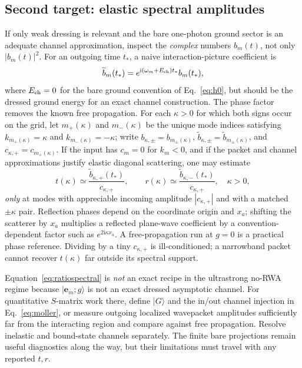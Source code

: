 \documentclass[11pt,a4paper]{article}
\newcommand{\ket}[1]{\lvert #1\rangle}
\newcommand{\ii}{\mathrm i}
\begin{document}
\subsection{Second target: elastic spectral amplitudes}
If only weak dressing is relevant and the bare one-photon ground sector is an adequate channel approximation, inspect the \emph{complex} numbers $b_m(t)$, not only $|b_m(t)|^2$. For an outgoing time $t_*$, a naive interaction-picture coefficient is
\begin{equation}
 \widetilde b_m(t_*)=e^{\ii(\omega_m+E_{\rm ch})t_*}b_m(t_*),
 \label{eq:interactionpicture}
\end{equation}
where $E_{\rm ch}=0$ for the bare ground convention of Eq.~\eqref{eq:h0}, but should be the dressed ground energy for an exact channel construction. The phase factor removes the known free propagation. For each $\kappa>0$ for which both signs occur on the grid, let $m_+(\kappa)$ and $m_-(\kappa)$ be the unique mode indices satisfying $k_{m_+(\kappa)}=\kappa$ and $k_{m_-(\kappa)}=-\kappa$; write $b_{\kappa,\pm}=b_{m_\pm(\kappa)}$, $\widetilde b_{\kappa,\pm}=\widetilde b_{m_\pm(\kappa)}$, and $c_{\kappa,+}=c_{m_+(\kappa)}$. If the input has $c_m=0$ for $k_m<0$, and if the packet and channel approximations justify elastic diagonal scattering, one may estimate
\begin{equation}
 t(\kappa)\simeq\frac{\widetilde b_{\kappa,+}(t_*)}{c_{\kappa,+}},
 \qquad
 r(\kappa)\simeq\frac{\widetilde b_{\kappa,-}(t_*)}{c_{\kappa,+}},
 \quad\kappa>0,
 \label{eq:ratiospectral}
\end{equation}
\emph{only} at modes with appreciable incoming amplitude $|c_{\kappa,+}|$ and with a matched $\pm\kappa$ pair. Reflection phases depend on the coordinate origin and $x_a$; shifting the scatterer by $x_a$ multiplies a reflected plane-wave coefficient by a convention-dependent factor such as $e^{2\ii\kappa x_a}$. A free-propagation run at $g=0$ is a practical phase reference. Dividing by a tiny $c_{\kappa,+}$ is ill-conditioned; a narrowband packet cannot recover $t(\kappa)$ far outside its spectral support.

Equation~\eqref{eq:ratiospectral} is \emph{not} an exact recipe in the ultrastrong no-RWA regime because $\ket{\mathbf e_m;g}$ is not an exact dressed asymptotic channel. For quantitative $S$-matrix work there, define $\ket G$ and the in/out channel injection in Eq.~\eqref{eq:moller}, or measure outgoing localized wavepacket amplitudes sufficiently far from the interacting region and compare against free propagation. Resolve inelastic and bound-state channels separately. The finite bare projections remain useful diagnostics along the way, but their limitations must travel with any reported $t,r$.
\end{document}

